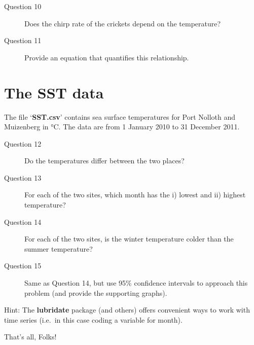 \documentclass[10pt,a4,]{article}
\begin{document}
\begin{description}
\item[Question 10] Does the chirp rate of the crickets depend on the temperature?
\item[Question 11] Provide an equation that quantifies this relationship.
\end{description}

\section{The SST data}

The file `\textbf{SST.csv}' contains sea surface temperatures for Port
Nolloth and Muizenberg in °C. The data are from 1 January 2010 to 31
December 2011.

\begin{description}
\item[Question 12] Do the temperatures differ between the two places?
\item[Question 13] For each of the two sites, which month has the i) lowest and ii) highest temperature?
\item[Question 14] For each of the two sites, is the winter temperature colder than the summer temperature?
\item[Question 15] Same as Question 14, but use 95\% confidence intervals to approach this problem (and provide the supporting graphs).
\end{description}

Hint: The \textbf{lubridate} package (and others) offers convenient ways
to work with time series (i.e.~in this case coding a variable for
month).

\hfill \break

That's all, Folks!
\end{document}

